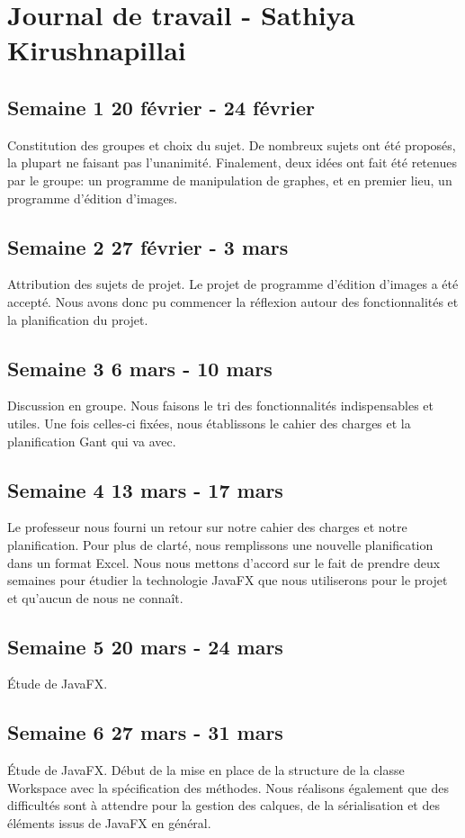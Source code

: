 \section{Journal de travail - Sathiya Kirushnapillai}

\subsection{Semaine 1 20 février - 24 février}
Constitution des groupes et choix du sujet. De nombreux sujets ont été proposés, la plupart ne faisant pas l'unanimité. Finalement, deux idées ont fait été retenues par le groupe: un programme de manipulation de graphes, et en premier lieu, un programme d'édition d'images.
\subsection{Semaine 2 27 février - 3 mars}
Attribution des sujets de projet. Le projet de programme d'édition d'images a été accepté. Nous avons donc pu commencer la réflexion autour des fonctionnalités et la planification du projet.
\subsection{Semaine 3 6 mars - 10 mars}
Discussion en groupe. Nous faisons le tri des fonctionnalités indispensables et utiles. Une fois celles-ci fixées, nous établissons le cahier des charges et la planification Gant qui va avec.
\subsection{Semaine 4 13 mars - 17 mars}
Le professeur nous fourni un retour sur notre cahier des charges et notre planification. Pour plus de clarté, nous remplissons une nouvelle planification dans un format Excel. Nous nous mettons d'accord sur le fait de prendre deux semaines pour étudier la technologie JavaFX que nous utiliserons pour le projet et qu'aucun de nous ne connaît.
\subsection{Semaine 5 20 mars - 24 mars}
Étude de JavaFX.
\subsection{Semaine 6 27 mars - 31 mars}
Étude de JavaFX. Début de la mise en place de la structure de la classe Workspace avec la spécification des méthodes. Nous réalisons également que des difficultés sont à attendre pour la gestion des calques, de la sérialisation et des éléments issus de JavaFX en général.
